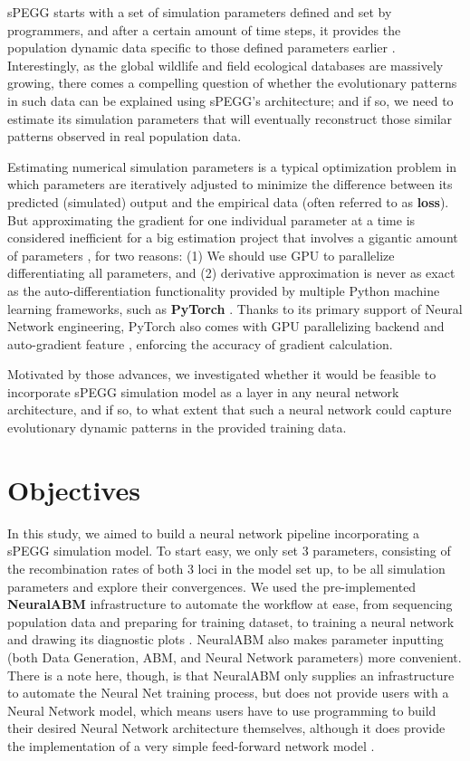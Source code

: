 \documentclass[12pt]{article}
\begin{document}
sPEGG starts with a set of simulation parameters defined and set by programmers, and after a certain amount of time steps, it provides the population dynamic data specific to those defined parameters earlier \cite{okamoto2018}. Interestingly, as the global wildlife and field ecological databases are massively growing, there comes a compelling question of whether the evolutionary patterns in such data can be explained using sPEGG's architecture; and if so, we need to estimate its simulation parameters that will eventually reconstruct those similar patterns observed in real population data.

Estimating numerical simulation parameters is a typical optimization problem in which parameters are iteratively adjusted to minimize the difference between its predicted (simulated) output and the empirical data (often referred to as \textbf{loss}). But approximating the gradient for one individual parameter at a time is considered inefficient for a big estimation project that involves a gigantic amount of parameters \cite{thgaskin2023neural}, for two reasons: (1) We should use GPU to parallelize differentiating all parameters, and (2) derivative approximation is never as exact as the auto-differentiation functionality provided by multiple Python machine learning frameworks, such as \textbf{PyTorch} \cite{paszke2017automatic}. Thanks to its primary support of Neural Network engineering, PyTorch also comes with GPU parallelizing backend and auto-gradient feature \cite{paszke2017automatic}, enforcing the accuracy of gradient calculation.

Motivated by those advances, we investigated whether it would be feasible to incorporate sPEGG simulation model as a layer in any neural network architecture, and if so, to what extent that such a neural network could capture evolutionary dynamic patterns in the provided training data.

\section{Objectives}

In this study, we aimed to build a neural network pipeline incorporating a sPEGG simulation model. To start easy, we only set 3 parameters, consisting of the recombination rates of both 3 loci in the model set up, to be all simulation parameters and explore their convergences. We used the pre-implemented \textbf{NeuralABM} infrastructure to automate the workflow at ease, from sequencing population data and preparing for training dataset, to training a neural network and drawing its diagnostic plots \cite{thgaskin2023neural}. NeuralABM also makes parameter inputting (both Data Generation, ABM, and Neural Network parameters) more convenient. There is a note here, though, is that NeuralABM only supplies an infrastructure to automate the Neural Net training process, but does not provide users with a Neural Network model, which means users have to use programming to build their desired Neural Network architecture themselves, although it does provide the implementation of a very simple feed-forward network model \cite{thgaskin2023neural}.
\end{document}
